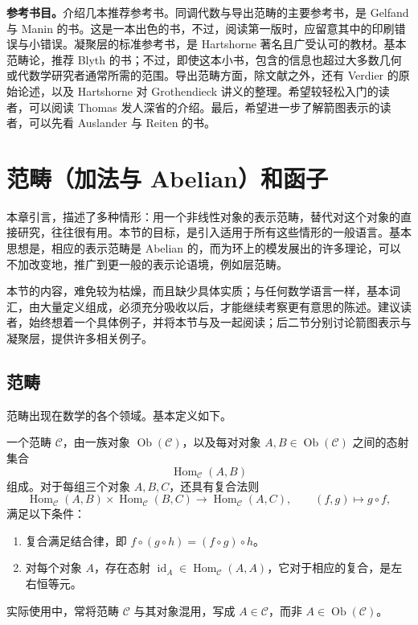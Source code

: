 \textbf{参考书目。}介绍几本推荐参考书。同调代数与导出范畴的主要参考书，是 Gelfand 与 Manin 的书。这是一本出色的书，不过，阅读第一版时，应留意其中的印刷错误与小错误。凝聚层的标准参考书，是 Hartshorne 著名且广受认可的教材。基本范畴论，推荐 Blyth 的书；不过，即使这本小书，包含的信息也超过大多数几何或代数学研究者通常所需的范围。导出范畴方面，除文献之外，还有 Verdier 的原始论述，以及 Hartshorne 对 Grothendieck 讲义的整理。希望较轻松入门的读者，可以阅读 Thomas 发人深省的介绍。最后，希望进一步了解箭图表示的读者，可以先看 Auslander 与 Reiten 的书。

\section{范畴（加法与 Abelian）和函子}\label{sec:4.1}

本章引言，描述了多种情形：用一个非线性对象的表示范畴，替代对这个对象的直接研究，往往很有用。本节的目标，是引入适用于所有这些情形的一般语言。基本思想是，相应的表示范畴是 Abelian 的，而为环上的模发展出的许多理论，可以不加改变地，推广到更一般的表示论语境，例如层范畴。

本节的内容，难免较为枯燥，而且缺少具体实质；与任何数学语言一样，基本词汇，由大量定义组成，必须充分吸收以后，才能继续考察更有意思的陈述。建议读者，始终想着一个具体例子，并将本节与及一起阅读；后二节分别讨论箭图表示与凝聚层，提供许多相关例子。

\subsection{范畴}\label{sec:4.1.1}

范畴出现在数学的各个领域。基本定义如下。
\begin{definition}\label{def:4.1}
一个范畴 $\mathcal{C}$，由一族对象 $\operatorname{Ob}(\mathcal{C})$，以及每对对象 $A,B\in\operatorname{Ob}(\mathcal{C})$ 之间的态射集合
\[
\operatorname{Hom}_{\mathcal{C}}(A,B)
\]
组成。对于每组三个对象 $A,B,C$，还具有复合法则
\[
\operatorname{Hom}_{\mathcal{C}}(A,B)\times
\operatorname{Hom}_{\mathcal{C}}(B,C)
\longrightarrow\operatorname{Hom}_{\mathcal{C}}(A,C),
\qquad(f,g)\longmapsto g\circ f,
\]
满足以下条件：
\begin{enumerate}[label=(\alph*)]
\item 复合满足结合律，即 $f\circ(g\circ h)=(f\circ g)\circ h$。
\item 对每个对象 $A$，存在态射 $\operatorname{id}_A\in\operatorname{Hom}_{\mathcal{C}}(A,A)$，它对于相应的复合，是左右恒等元。
\end{enumerate}
\end{definition}
实际使用中，常将范畴 $\mathcal{C}$ 与其对象混用，写成 $A\in\mathcal{C}$，而非 $A\in\operatorname{Ob}(\mathcal{C})$。

